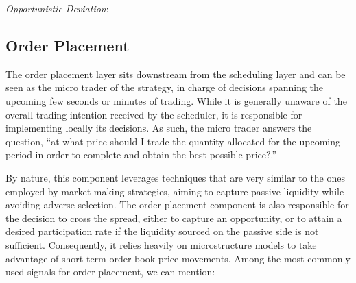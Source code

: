 \noindent\emph{Opportunistic Deviation}: 

\subsection{Order Placement}


The order placement layer sits downstream from the scheduling layer and can be seen as the micro trader of the strategy, in charge of decisions spanning the upcoming few seconds or minutes of trading. While it is generally unaware of the overall trading intention received by the scheduler, it is responsible for implementing locally its decisions. As such, the micro trader answers the question, ``at what price should I trade the quantity allocated for the upcoming period in order to complete and obtain the best possible price?.''


By nature, this component leverages techniques that are very similar to the ones employed by market making strategies, aiming to capture passive liquidity while avoiding adverse selection. The order placement component is also responsible for the decision to cross the spread, either to capture an opportunity, or to attain a desired participation rate if the liquidity sourced on the passive side is not sufficient. Consequently, it relies heavily on microstructure models to take advantage of short-term order book price movements. Among the most commonly used signals for order placement, we can mention:


